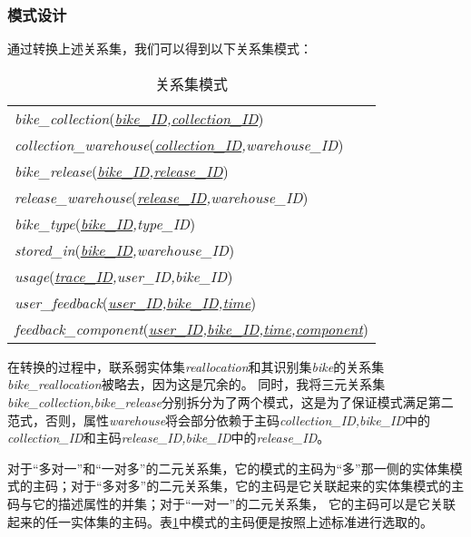 \subsubsection{模式设计}
通过转换上述关系集，我们可以得到以下关系集模式：
\begin{table}[!hpt]
    \caption{关系集模式}
    \label{tab:relationschema}
    \centering
    \begin{tabular}{l} \toprule
         \textit{bike\_collection}(\textit{\underline{bike\_ID},\underline{collection\_ID}})\\
         \textit{collection\_warehouse}(\textit{\underline{collection\_ID},warehouse\_ID})\\
         \textit{bike\_release}(\textit{\underline{bike\_ID},\underline{release\_ID}})\\
         \textit{release\_warehouse}(\textit{\underline{release\_ID},warehouse\_ID})\\
         \textit{bike\_type}(\textit{\underline{bike\_ID},type\_ID})\\
         \textit{stored\_in}(\textit{\underline{bike\_ID},warehouse\_ID})\\
         \textit{usage}(\textit{\underline{trace\_ID},user\_ID,bike\_ID})\\
         \textit{user\_feedback}(\textit{\underline{user\_ID},\underline{bike\_ID},\underline{time}})\\
         \textit{feedback\_component}(\textit{\underline{user\_ID},\underline{bike\_ID},\underline{time},\underline{component}})\\
         \bottomrule
    \end{tabular}
  \end{table}

  在转换的过程中，联系弱实体集\textit{reallocation}和其识别集\textit{bike}的关系集\textit{bike\_reallocation}被略去，因为这是冗余的\cite{dbconcept2}。
  同时，我将三元关系集\textit{bike\_collection,bike\_release}分别拆分为了两个模式，这是为了保证模式满足第二范式，否则，属性\textit{warehouse}将会部分依赖于主码\textit{collection\_ID,bike\_ID}中的\textit{collection\_ID}和主码\textit{release\_ID,bike\_ID}中的\textit{release\_ID}。

  对于“多对一”和“一对多”的二元关系集，它的模式的主码为“多”那一侧的实体集模式的主码；对于“多对多”的二元关系集，它的主码是它关联起来的实体集模式的主码与它的描述属性的并集；对于“一对一”的二元关系集，
  它的主码可以是它关联起来的任一实体集的主码\cite{dbconcept3}。表\ref{tab:relationschema}中模式的主码便是按照上述标准进行选取的。

